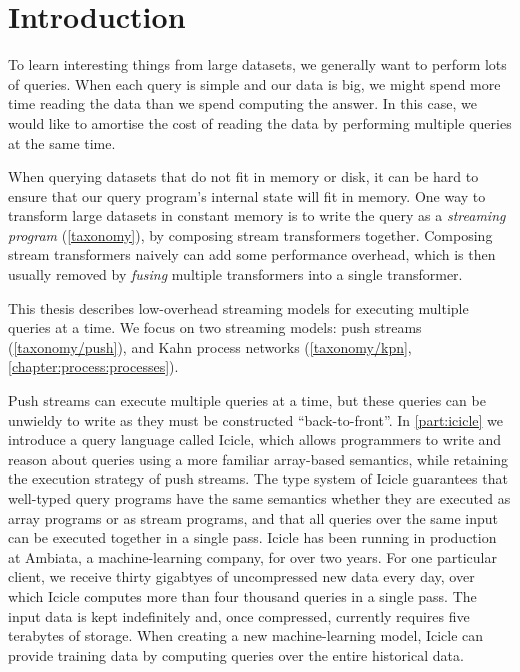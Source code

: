 \chapter{Introduction}
\label{introduction}
To learn interesting things from large datasets, we generally want to perform lots of queries.
When each query is simple and our data is big, we might spend more time reading the data than we spend computing the answer.
In this case, we would like to amortise the cost of reading the data by performing multiple queries at the same time.

When querying datasets that do not fit in memory or disk, it can be hard to ensure that our query program's internal state will fit in memory.
One way to transform large datasets in constant memory is to write the query as a \emph{streaming program} (\cref{taxonomy}), by composing stream transformers together.
Composing stream transformers naively can add some performance overhead, which is then usually removed by \emph{fusing} multiple transformers into a single transformer.

This thesis describes low-overhead streaming models for executing multiple queries at a time.
We focus on two streaming models: push streams (\cref{taxonomy/push}), and Kahn process networks (\cref{taxonomy/kpn}, \cref{chapter:process:processes}).

Push streams can execute multiple queries at a time, but these queries can be unwieldy to write as they must be constructed ``back-to-front''.
In \cref{part:icicle} we introduce a query language called Icicle, which allows programmers to write and reason about queries using a more familiar array-based semantics, while retaining the execution strategy of push streams.
The type system of Icicle guarantees that well-typed query programs have the same semantics whether they are executed as array programs or as stream programs, and that all queries over the same input can be executed together in a single pass.
Icicle has been running in production at Ambiata, a machine-learning company, for over two years.
For one particular client, we receive thirty gigabtyes of uncompressed new data every day, over which Icicle computes more than four thousand queries in a single pass.
The input data is kept indefinitely and, once compressed, currently requires five terabytes of storage.
When creating a new machine-learning model, Icicle can provide training data by computing queries over the entire historical data.

